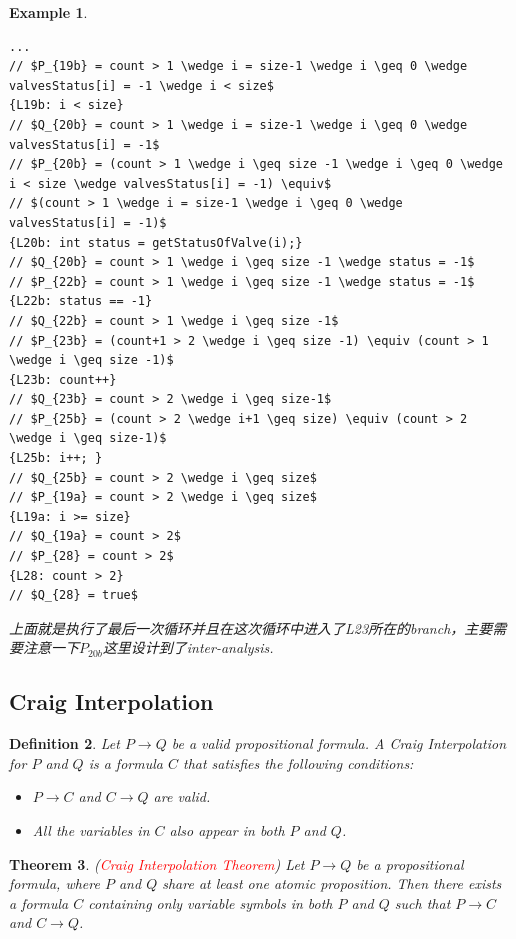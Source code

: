 \documentclass{article}
\newtheorem{theorem}{Theorem}[section]
\newtheorem{example}[theorem]{Example}
\newtheorem{definition}[theorem]{Definition}
\newcommand{\redt}[1]{\textcolor{red}{#1}}
\begin{document}
\begin{example}
\begin{verbatim}
...
// $P_{19b} = count > 1 \wedge i = size-1 \wedge i \geq 0 \wedge valvesStatus[i] = -1 \wedge i < size$
{L19b: i < size}
// $Q_{20b} = count > 1 \wedge i = size-1 \wedge i \geq 0 \wedge valvesStatus[i] = -1$
// $P_{20b} = (count > 1 \wedge i \geq size -1 \wedge i \geq 0 \wedge i < size \wedge valvesStatus[i] = -1) \equiv$
// $(count > 1 \wedge i = size-1 \wedge i \geq 0 \wedge valvesStatus[i] = -1)$
{L20b: int status = getStatusOfValve(i);}
// $Q_{20b} = count > 1 \wedge i \geq size -1 \wedge status = -1$
// $P_{22b} = count > 1 \wedge i \geq size -1 \wedge status = -1$
{L22b: status == -1}
// $Q_{22b} = count > 1 \wedge i \geq size -1$
// $P_{23b} = (count+1 > 2 \wedge i \geq size -1) \equiv (count > 1 \wedge i \geq size -1)$
{L23b: count++}
// $Q_{23b} = count > 2 \wedge i \geq size-1$
// $P_{25b} = (count > 2 \wedge i+1 \geq size) \equiv (count > 2 \wedge i \geq size-1)$ 
{L25b: i++; }
// $Q_{25b} = count > 2 \wedge i \geq size$
// $P_{19a} = count > 2 \wedge i \geq size$
{L19a: i >= size}
// $Q_{19a} = count > 2$ 
// $P_{28} = count > 2$
{L28: count > 2}
// $Q_{28} = true$
\end{verbatim}
上面就是执行了最后一次循环并且在这次循环中进入了L23所在的branch，主要需要注意一下$P_{20b}$这里设计到了inter-analysis. 
\end{example}


\newpage
\subsection{Craig Interpolation}

\begin{definition}
\rm Let $P \to Q$ be a valid propositional formula. A Craig Interpolation for $P$ and $Q$ is a formula $C$ that satisfies the following conditions:
\begin{itemize}
	\item $P \to C$ and $C \to Q$ are valid.
	\item All the variables in $C$ also appear in both $P$ and $Q$.
\end{itemize}
\end{definition}

\begin{theorem}
\rm (\redt{Craig Interpolation Theorem}) Let $P \to Q$ be a propositional formula, where $P$ and $Q$ share at least one atomic proposition. Then there exists a formula $C$ containing only variable symbols in both $P$ and $Q$ such that $P \to C$ and $C \to Q$.
\end{theorem}
\end{document}
